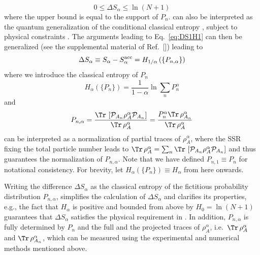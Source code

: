 %
\begin{equation}
 0 \le \Delta S_\alpha \le \ln (N+1)
\label{eq:DeltaS_alpha_inq}
\end{equation}
%
where the upper bound is equal to the support of $P_n$.  can also be interpreted as the quantum generalization of the conditional classical \ren entropy \cite{Cachin97entropymeasures,GolshaniPashaYari:2009,Hayashi:2011,SKORIC:2011el,FehrBerens2014}, subject to physical constraints \cite{Barghathi:2018oe}. The arguments leading to Eq.~\eqref{eq:DS1H1} can then be generalized (see the supplemental material of Ref.~[]) leading to 
%
\begin{equation}
    \Delta S_{\alpha}\equiv  S_{\alpha} - S_{\alpha}^{{\rm acc}} = H_{{1}/{\alpha}}\left(\{P_{n,\alpha}\}\right)
\label{eq:S_alpha_acc5}
\end{equation}
%
where we introduce the classical \ren entropy of $P_n$
%
\begin{equation}
    H_{\alpha}\left(\{P_n\}\right)=\frac{1}{1-\alpha}\ln\sum_n P_n^{\alpha} 
\label{eq:Halpha}
\end{equation}
%
and
%
\begin{equation}
    P_{n,\alpha}=\frac{\Tr\, \left[{\mathcal{P}}_{A_{n}} \rho_A^{\alpha} {\mathcal{P}}_{A_{n}}\right]}{\Tr\, \rho_A^{\alpha}}=\frac{ P_n^\alpha\Tr\, \rho_{A_n}^{\alpha}}{\Tr\, \rho_A^{\alpha}}
\label{eq:Pna}
\end{equation}
%
can be interpreted as a normalization of partial traces of $\rho_A^{\alpha}$, where the SSR fixing the total particle number leads to $\Tr\, \rho_A^{\alpha}=\sum_n \Tr\, \left[{\mathcal{P}}_{A_{n}} \rho_A^{\alpha} {\mathcal{P}}_{A_{n}}\right]$ and thus guarantees the normalization of $P_{n,\alpha}$. Note that we have defined $P_{n,1} \equiv P_n$ for notational consistency. For brevity, let $H_{\alpha}(\{P_n\}) \equiv H_{\alpha}$ from here onwards. 

Writing the difference $\Delta S_{\alpha}$ as the classical \ren entropy of the fictitious probability distribution $P_{n,\alpha}$, simplifies the calculation of $\Delta S_{\alpha}$ and clarifies its properties, e.g., the fact that $H_{\alpha}$  is positive and bounded from above by $ H_{0}=\ln(N+1)$ guarantees that $\Delta S_{\alpha}$ satisfies the physical requirement in . \cite{Barghathi:2018oe} In addition, $P_{n,\alpha}$ is fully determined by $P_n$ and the full and the projected traces of $\rho_A^{\alpha}$, i.e.~$\Tr\, \rho_{A}^{\alpha}$ and $\Tr\, \rho_{A_n}^{\alpha}$, which can be measured using the experimental and numerical methods mentioned above.

